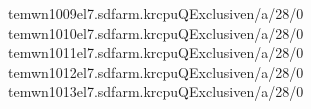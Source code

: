 \documentclass[a4paper,11pt,english]{sphinxmanual}
\begin{document}
\begin{sphinxVerbatim}[commandchars=\\\{\}]
tem\PYGZhy{}wn1009\PYGZhy{}el7.sdfarm.krcpuQExclusiven/a/28/0\PYG{o}{[}\PYG{c+c1}{\PYGZsh{}\PYGZsh{}\PYGZsh{}\PYGZsh{}\PYGZsh{}\PYGZsh{}\PYGZsh{}\PYGZsh{}\PYGZsh{}\PYGZsh{}\PYGZsh{}\PYGZsh{}\PYGZsh{}\PYGZsh{}\PYGZsh{}\PYGZsh{}\PYGZsh{}\PYGZsh{}\PYGZsh{}\PYGZsh{}\PYGZsh{}\PYGZsh{}\PYGZsh{}\PYGZsh{}\PYGZsh{}\PYGZsh{}\PYGZsh{}\PYGZsh{}]}
tem\PYGZhy{}wn1010\PYGZhy{}el7.sdfarm.krcpuQExclusiven/a/28/0\PYG{o}{[}\PYG{c+c1}{\PYGZsh{}\PYGZsh{}\PYGZsh{}\PYGZsh{}\PYGZsh{}\PYGZsh{}\PYGZsh{}\PYGZsh{}\PYGZsh{}\PYGZsh{}\PYGZsh{}\PYGZsh{}\PYGZsh{}\PYGZsh{}\PYGZsh{}\PYGZsh{}\PYGZsh{}\PYGZsh{}\PYGZsh{}\PYGZsh{}\PYGZsh{}\PYGZsh{}\PYGZsh{}\PYGZsh{}\PYGZsh{}\PYGZsh{}\PYGZsh{}\PYGZsh{}]}
tem\PYGZhy{}wn1011\PYGZhy{}el7.sdfarm.krcpuQExclusiven/a/28/0\PYG{o}{[}\PYG{c+c1}{\PYGZsh{}\PYGZsh{}\PYGZsh{}\PYGZsh{}\PYGZsh{}\PYGZsh{}\PYGZsh{}\PYGZsh{}\PYGZsh{}\PYGZsh{}\PYGZsh{}\PYGZsh{}\PYGZsh{}\PYGZsh{}\PYGZsh{}\PYGZsh{}\PYGZsh{}\PYGZsh{}\PYGZsh{}\PYGZsh{}\PYGZsh{}\PYGZsh{}\PYGZsh{}\PYGZsh{}\PYGZsh{}\PYGZsh{}\PYGZsh{}\PYGZsh{}]}
tem\PYGZhy{}wn1012\PYGZhy{}el7.sdfarm.krcpuQExclusiven/a/28/0\PYG{o}{[}\PYG{c+c1}{\PYGZsh{}\PYGZsh{}\PYGZsh{}\PYGZsh{}\PYGZsh{}\PYGZsh{}\PYGZsh{}\PYGZsh{}\PYGZsh{}\PYGZsh{}\PYGZsh{}\PYGZsh{}\PYGZsh{}\PYGZsh{}\PYGZsh{}\PYGZsh{}\PYGZsh{}\PYGZsh{}\PYGZsh{}\PYGZsh{}\PYGZsh{}\PYGZsh{}\PYGZsh{}\PYGZsh{}\PYGZsh{}\PYGZsh{}\PYGZsh{}\PYGZsh{}]}
tem\PYGZhy{}wn1013\PYGZhy{}el7.sdfarm.krcpuQExclusiven/a/28/0\PYG{o}{[}\PYG{c+c1}{\PYGZsh{}\PYGZsh{}\PYGZsh{}\PYGZsh{}\PYGZsh{}\PYGZsh{}\PYGZsh{}\PYGZsh{}\PYGZsh{}\PYGZsh{}\PYGZsh{}\PYGZsh{}\PYGZsh{}\PYGZsh{}\PYGZsh{}\PYGZsh{}\PYGZsh{}\PYGZsh{}\PYGZsh{}\PYGZsh{}\PYGZsh{}\PYGZsh{}\PYGZsh{}\PYGZsh{}\PYGZsh{}\PYGZsh{}\PYGZsh{}\PYGZsh{}]}
\PYGZhy{}\PYGZhy{}\PYGZhy{}\PYGZhy{}\PYGZhy{}\PYGZhy{}\PYGZhy{}\PYGZhy{}\PYGZhy{}\PYGZhy{}\PYGZhy{}\PYGZhy{}\PYGZhy{}\PYGZhy{}\PYGZhy{}\PYGZhy{}\PYGZhy{}\PYGZhy{}\PYGZhy{}\PYGZhy{}\PYGZhy{}\PYGZhy{}\PYGZhy{}\PYGZhy{}\PYGZhy{}\PYGZhy{}\PYGZhy{}\PYGZhy{}\PYGZhy{}\PYGZhy{}\PYGZhy{}\PYGZhy{}\PYGZhy{}\PYGZhy{}\PYGZhy{}\PYGZhy{}\PYGZhy{}\PYGZhy{}\PYGZhy{}\PYGZhy{}\PYGZhy{}\PYGZhy{}\PYGZhy{}\PYGZhy{}\PYGZhy{}\PYGZhy{}\PYGZhy{}\PYGZhy{}\PYGZhy{}\PYGZhy{}\PYGZhy{}\PYGZhy{}\PYGZhy{}\PYGZhy{}\PYGZhy{}\PYGZhy{}\PYGZhy{}\PYGZhy{}\PYGZhy{}\PYGZhy{}\PYGZhy{}\PYGZhy{}\PYGZhy{}\PYGZhy{}\PYGZhy{}\PYGZhy{}\PYGZhy{}\PYGZhy{}\PYGZhy{}\PYGZhy{}\PYGZhy{}\PYGZhy{}\PYGZhy{}\PYGZhy{}\PYGZhy{}\PYGZhy{}\PYGZhy{}\PYGZhy{}\PYGZhy{}\PYGZhy{}\PYGZhy{}\PYGZhy{}\PYGZhy{}\PYGZhy{}\PYGZhy{}\PYGZhy{}\PYGZhy{}\PYGZhy{}\PYGZhy{}\PYGZhy{}\PYGZhy{}\PYGZhy{}\PYGZhy{}\PYGZhy{}\PYGZhy{}\PYGZhy{}\PYGZhy{}\PYGZhy{}\PYGZhy{}\PYGZhy{}\PYGZhy{}\PYGZhy{}\PYGZhy{}\PYGZhy{}\PYGZhy{}\PYGZhy{}\PYGZhy{}\PYGZhy{}\PYGZhy{}\PYGZhy{}\PYGZhy{}\PYGZhy{}\PYGZhy{}\PYGZhy{}\PYGZhy{}\PYGZhy{}\PYGZhy{}\PYGZhy{}\PYGZhy{}\PYGZhy{}

\end{sphinxVerbatim}
\end{document}
